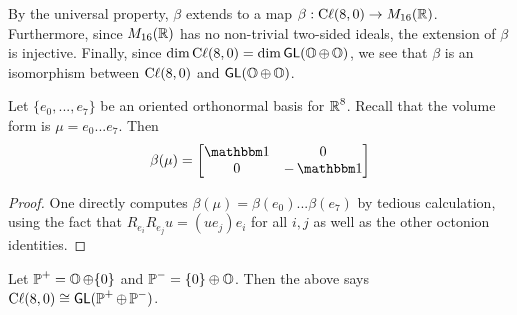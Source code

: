 \begin{cor}
    By the universal property, $\beta$ extends to a map $\beta : \operatorname{C\ell}(8,0) \to M_{16}(\operatorname{\mathbb{R}})$. Furthermore, since $M_{16}(\operatorname{\mathbb{R}})$ has no non-trivial two-sided ideals, the extension of $\beta$ is injective. Finally, since $\dim \operatorname{C\ell}(8,0)= \dim \operatorname{\textsf{GL}}(\operatorname{\mathbb{O}}\oplus \operatorname{\mathbb{O}})$, we see that $\beta$ is an isomorphism between $\operatorname{C\ell}(8,0)$ and $\operatorname{\textsf{GL}}(\operatorname{\mathbb{O}}\oplus \operatorname{\mathbb{O}})$.
\end{cor}
\begin{lemma}
    Let $\{e_0,...,e_7\}$ be an oriented orthonormal basis for $\operatorname{\mathbb{R}}^8$. Recall that the volume form is $\mu = e_0...e_7$. Then \[\beta(\mu) = \m{\One&0\\0&-\One}\]
\end{lemma}
\begin{proof}
    One directly computes $\beta(\mu) = \beta(e_0)...\beta(e_7)$ by tedious calculation, using the fact that $R_{e_i}R_{e_j}u = (ue_j)e_i$ for all $i,j$ as well as the other octonion identities.
\end{proof}
\begin{remark*}
    Let $\operatorname{\mathbb{P}}^+ = \operatorname{\mathbb{O}}\oplus \{0\}$ and $\operatorname{\mathbb{P}}^- = \{0\}\oplus \operatorname{\mathbb{O}}$. Then the above says $\operatorname{C\ell}(8,0) \cong \operatorname{\textsf{GL}}(\operatorname{\mathbb{P}}^+\oplus \operatorname{\mathbb{P}}^-)$.
\end{remark*}

